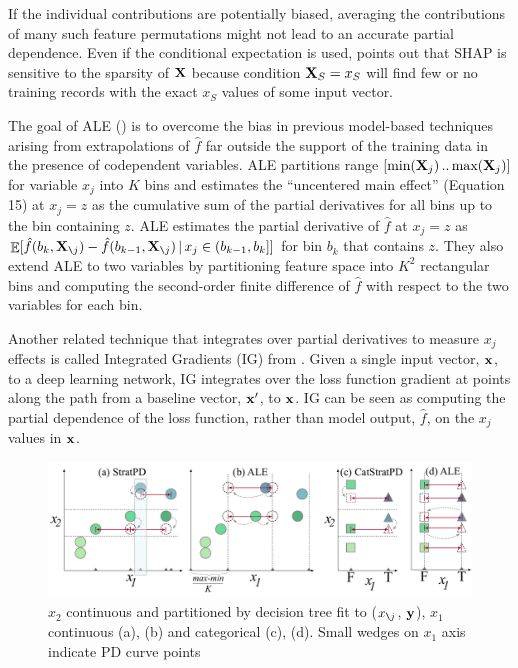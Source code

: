 \documentclass{article}
\newcommand{\xnj}{$x_{\texttt{\char`\\} j}$}
\renewcommand{\slash}{\texttt{\char`\\}}
\DeclareMathOperator{\Ex}{\mathbb{E}}
\begin{document}
If the individual contributions are potentially biased, averaging the contributions of many such feature permutations might not lead to an accurate partial dependence.  Even if the conditional expectation is used, \cite{manyshap} points out that SHAP is sensitive to the sparsity of $\bf X$ because condition ${\bf X}_S = x_S$ will find few or no training records with the exact $x_S$ values of some input vector.


The goal of ALE (\cite{ALE}) is to overcome the bias in previous model-based techniques arising from extrapolations of $\hat{f}$ far outside the support of the training data in the presence of codependent variables.   ALE  partitions range $[\text{min}({\bf X}_j) \,..\, \text{max}({\bf X}_j)]$ for variable $x_j$ into $K$ bins and estimates the ``uncentered main effect'' (Equation 15) at $x_j = z$ as the cumulative sum of the partial derivatives for all bins up to the bin containing $z$. ALE estimates the partial derivative of $\hat{f}$ at $x_j=z$ as $\Ex[\hat{f}(b_k, {\bf X}_{\slash j}) - \hat{f}(b_{k-1}, {\bf X}_{\slash j}) \, | \, x_j \in (b_{k-1},b_k]]$ for bin $b_k$ that contains $z$. They also extend ALE to two variables by partitioning feature space into $K^2$ rectangular bins and computing the  second-order finite difference of $\hat{f}$ with respect to the two variables for each bin. 

Another related technique that integrates over partial derivatives to measure $x_j$ effects is called Integrated Gradients (IG) from \cite{intgrad}. Given a single input vector, $\bf x$, to a deep learning network, IG integrates over the loss function gradient at points along the path from a baseline vector, $\bf x'$, to $\bf x$. IG can be seen as computing the partial dependence of the loss function, rather than model output, $\hat{f}$, on the $x_j$ values in ${\bf x}$.

\begin{figure}[htbp]
\begin{center}
\includegraphics[scale=.4]{images/partitioning.pdf}
\caption{\small $x_2$ continuous and partitioned by decision tree fit to (\xnj, ${\bf y}$), $x_1$ continuous (a), (b) and categorical (c), (d). Small wedges on $x_1$ axis indicate PD curve points}
\label{fig:partitioning}
\end{center}
\end{figure}
\end{document}
